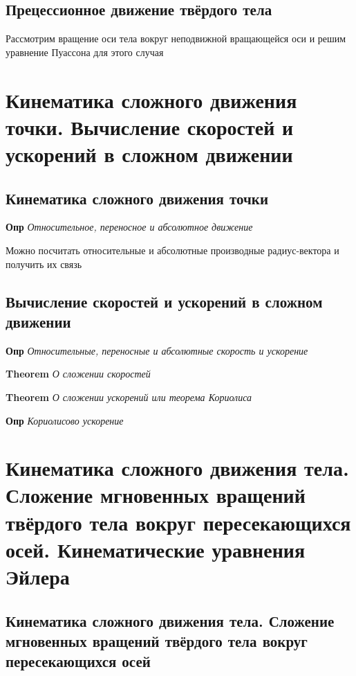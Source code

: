 \documentclass[a4paper, 14pt]{article}
\begin{document}
    \subsection{Прецессионное движение твёрдого тела}
    
    Рассмотрим вращение оси тела вокруг неподвижной вращающейся оси и решим уравнение Пуассона для этого случая
    
    \section{Кинематика сложного движения точки.
    Вычисление скоростей и ускорений в сложном движении}
    
    \subsection{Кинематика сложного движения точки}
    
    \textbf{Опр} \textit{Относительное, переносное и абсолютное движение}
    
    Можно посчитать относительные и абсолютные производные радиус-вектора и получить их связь
    
    \subsection{Вычисление скоростей и ускорений в сложном движении}
    
    \textbf{Опр} \textit{Относительные, переносные и абсолютные скорость и ускорение}
    
    \textbf{Theorem} \textit{О сложении скоростей}
    
    \textbf{Theorem} \textit{О сложении ускорений или теорема Кориолиса}
    
    \textbf{Опр} \textit{Кориолисово ускорение}
    
    \section{Кинематика сложного движения тела.
    Сложение мгновенных вращений твёрдого тела вокруг пересекающихся осей.
    Кинематические уравнения Эйлера}
    
    \subsection{Кинематика сложного движения тела. Сложение мгновенных вращений твёрдого тела вокруг пересекающихся
    осей}
    
\end{document}
